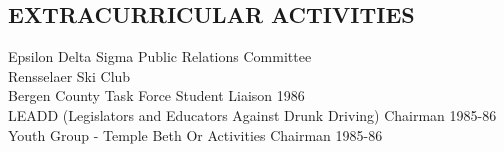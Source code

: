 \documentclass{res}
\begin{document}
\begin{resume}
\section{EXTRACURRICULAR ACTIVITIES}          
    Epsilon Delta Sigma Public Relations Committee \\         
    Rensselaer Ski Club     \\     
    Bergen County Task Force Student Liaison 1986  \\        
    LEADD (Legislators and Educators Against Drunk Driving) Chairman
     1985-86  \\        
    Youth Group - Temple Beth Or Activities Chairman 1985-86          
 
\end{resume}
\end{document}
